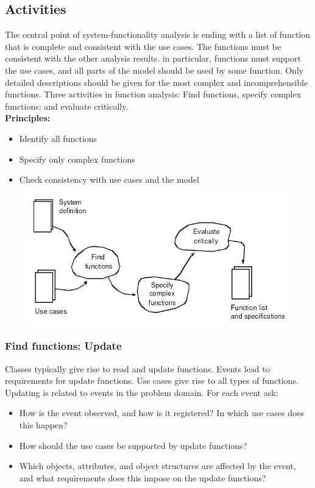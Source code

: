 \subsection{Activities}
The central point of system-functionality analysis is ending with a list of function that is complete and consistent with the use cases. The functions must be consistent with the other analysis results. in particular, functions must support the use cases, and all parts of the model should be used by some function. Only detailed descriptions should be given for the most complex and incomprehensible functions. Three activities in function analysis: Find functions, specify complex functions: and evaluate critically.
\\\textbf{Principles:}
\begin{itemize}
    \item Identify all functions
    \item Specify only complex functions
    \item Check consistency with use cases and the model
\end{itemize}

\begin{figure}[H]
    \centering
    \includegraphics[width=.7\textwidth]{figures/functionsactivities.png}
\end{figure}

\subsubsection{Find functions: Update}
Classes typically give rise to read and update functions. Events lead to requirements for update functions. Use cases give rise to all types of functions. Updating is related to events in the problem domain. For each event ask:

\begin{itemize}
    \item How is the event observed, and how is it registered? In which use cases does this happen?
    \item How should the use cases be supported by update functions?
    \item Which objects, attributes, and object structures are affected by the event, and what requirements does this impose on the update functions?
\end{itemize}

